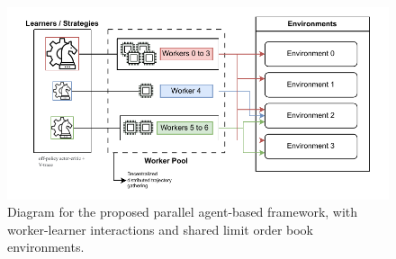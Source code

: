 \begin{figure}[H]
    \centering
    \includegraphics[width=\textwidth]{diagram}
    \caption{Diagram for the proposed parallel agent-based framework, with worker-learner interactions and shared limit order book environments.}
    \label{fig:framework}
\end{figure}


